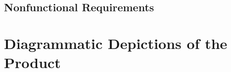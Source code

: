 \documentclass[12pt]{article}
\begin{document}
\subsection{Nonfunctional Requirements}


\section{Diagrammatic Depictions of the Product}
\label{sec:diagrams}
\end{document}
